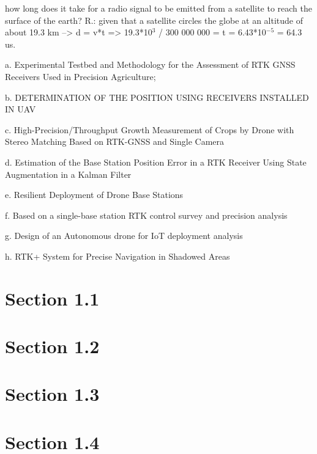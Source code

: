     how long does it take for a radio signal to be emitted from a satellite to reach the surface of the earth? 
    R.: given that a satellite circles the globe at an altitude of about 19.3 km --> d = v*t => 19.3*10$^3$ / 300 000 000 = t = 6.43*10$^{-5}$ = 64.3 us.

a. Experimental Testbed and Methodology for the
Assessment of RTK GNSS Receivers Used
in Precision Agriculture;

b. DETERMINATION OF THE POSITION USING
RECEIVERS INSTALLED IN UAV

c. High-Precision/Throughput Growth Measurement of
Crops by Drone with Stereo Matching Based on
RTK-GNSS and Single Camera

d. Estimation of the Base Station Position Error in a
RTK Receiver Using State Augmentation in a
Kalman Filter

e. Resilient Deployment of Drone Base Stations

f. Based on a single-base station RTK control survey
and precision analysis 

g. Design of an Autonomous drone for IoT deployment
analysis 

h. RTK+ System for Precise Navigation in Shadowed
Areas 

\section{Section 1.1}\label{sub:sub1_1}

\section{Section 1.2}\label{sec:sub1_2}

\section{Section 1.3}\label{sec:sub1_3}

\section{Section 1.4}\label{sec:sub1_4}